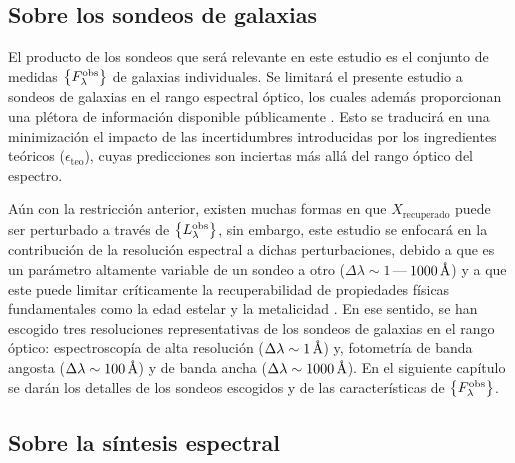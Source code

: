 \subsection{Sobre los sondeos de galaxias}

El producto de los sondeos que será relevante en este estudio es el conjunto de medidas
$\set{\sedt[F]{obs}}$ de galaxias individuales. Se limitará el presente estudio a sondeos de
galaxias en el rango espectral óptico, los cuales además proporcionan una plétora de información
disponible públicamente \citep[\eg,][]{Wolf2003, Moles2008, Abazajian2009}. Esto se traducirá en una
minimización el impacto de las incertidumbres introducidas por los ingredientes teóricos
($\epsilon_\text{teo}$), cuyas predicciones son inciertas más allá del rango óptico del espectro.

Aún con la restricción anterior, existen muchas formas en que $X_\text{recuperado}$ puede ser
perturbado a través de $\set{\sedt{obs}}$, sin embargo, este estudio se enfocará en la contribución
de la resolución espectral a dichas perturbaciones, debido a que es un parámetro altamente variable
de un sondeo a otro ($\Delta\lambda\sim1\,$---$\,\unit[1000]{\AA}$) y a que este puede limitar
críticamente la recuperabilidad de propiedades físicas fundamentales como la edad estelar y la
metalicidad \citep[\eg,][]{MacArthur2010, Pforr2012, Mitchell2013}. En ese sentido, se han escogido
tres resoluciones representativas de los sondeos de galaxias en el rango óptico: espectroscopía de
alta resolución ($\Delta\lambda\sim\unit[1]{\AA}$) y, fotometría de banda angosta
($\Delta\lambda\sim\unit[100]{\AA}$) y de banda ancha ($\Delta\lambda\sim\unit[1000]{\AA}$). En el
siguiente capítulo se darán los detalles de los sondeos escogidos y de las características de
$\set{\sedt[F]{obs}}$.

\subsection{Sobre la síntesis espectral}

